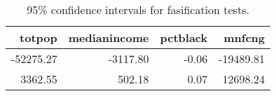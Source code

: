 
\begin{longtable}[t]{rrrr}
\caption{\label{tab:ci-tbl-lr-1}95\% confidence intervals for fasification tests.}\\
\toprule
totpop & medianincome & pctblack & mnfcng\\
\midrule
-52275.27 & -3117.80 & -0.06 & -19489.81\\
3362.55 & 502.18 & 0.07 & 12698.24\\
\bottomrule
\end{longtable}
